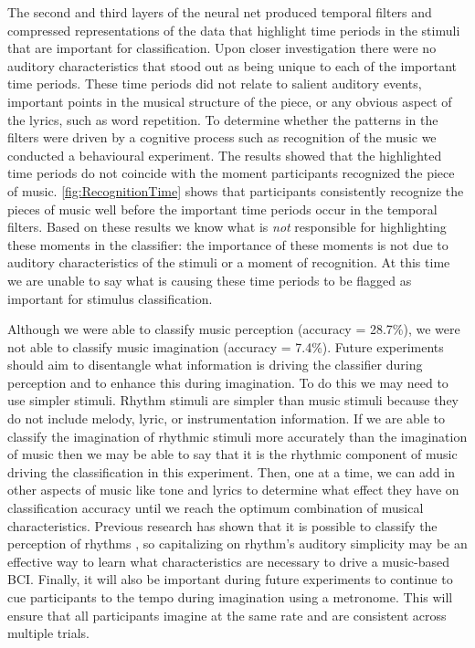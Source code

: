The second and third layers of the neural net produced temporal filters and compressed representations of the data that highlight time periods in the stimuli that are important for classification. 
Upon closer investigation there were no auditory characteristics that stood out as being unique to each of the important time periods.
These time periods did not relate to salient auditory events, important points in the musical structure of the piece, or any obvious aspect of the lyrics, such as word repetition. 
To determine whether the patterns in the filters were driven by a cognitive process such as recognition of the music we conducted a behavioural experiment.
The results showed that the highlighted time periods do not coincide with the moment participants recognized the piece of music. 
\autoref{fig:RecognitionTime} shows that participants consistently recognize the pieces of music well before the important time periods occur in the temporal filters. 
Based on these results we know what is \emph{not} responsible for highlighting these moments in the classifier: the importance of these moments is not due to auditory characteristics of the stimuli or a moment of recognition.
At this time we are unable to say what is causing these time periods to be flagged as important for stimulus classification. 

Although we were able to classify music perception (accuracy = 28.7\%), we were not able to classify music imagination (accuracy = 7.4\%).
Future experiments should aim to disentangle what information is driving the classifier during perception and to enhance this during imagination.
To do this we may need to use simpler stimuli.
Rhythm stimuli are simpler than music stimuli because they do not include melody, lyric, or instrumentation information. 
If we are able to classify the imagination of rhythmic stimuli more accurately than the imagination of music then we may be able to say that it is the rhythmic component of music driving the classification in this experiment.
Then, one at a time, we can add in other aspects of music like tone and lyrics to determine what effect they have on classification accuracy until we reach the optimum combination of musical characteristics.
Previous research has shown that it is possible to classify the perception of rhythms \cite{stober2014audiomostly}, so capitalizing on rhythm's auditory simplicity may be an effective way to learn what characteristics are necessary to drive a music-based \ac{BCI}.
Finally, it will also be important during future experiments to continue to cue participants to the tempo during imagination using a metronome.
This will ensure that all participants imagine at the same rate and are consistent across multiple trials.